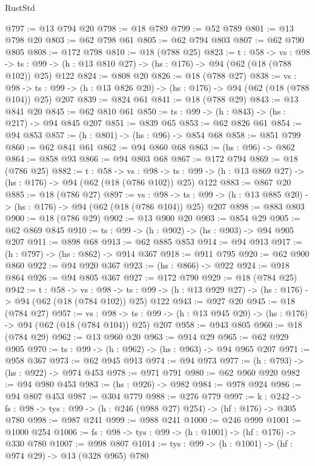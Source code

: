 \begin{lexlean}{RustStd}
\begin{coremodule}
{\begin{coremodule}
{{{{{{{{{{{@797 := @13 @794 @20
@798 := @18 @789
@799 := @52 @789
@801 := @13 @798 @20
@803 := @62 @798 @61
@805 := @62 @794 @803
@807 := @62 @790 @805
@808 := @172 @798
@810 := @18 (@788 @25)
@823 := {t : @58} ->
  {vs : @98} ->
  {ts : @99} -> (h : @13 @810 @27) -> (hs : @176) -> @94 (@62 (@18 (@788 @102)) @25) @122
@824 := @808 @20
@826 := @18 (@788 @27)
@838 := {vs : @98} ->
  {ts : @99} -> (h : @13 @826 @20) -> (hs : @176) -> @94 (@62 (@18 (@788 @104)) @25) @207
@839 := @824 @61
@841 := @18 (@788 @29)
@843 := @13 @841 @20
@845 := @62 @810 @61
@850 := {ts : @99} -> (h : @843) -> (hs : @217) -> @94 @845 @207
@851 := @839 @65
@853 := @62 @826 @61
@854 := @94 @853
@857 := (h : @801) -> (hs : @96) -> @854 @68
@858 := @851 @799
@860 := @62 @841 @61
@862 := @94 @860 @68
@863 := (hs : @96) -> @862
@864 := @858 @93
@866 := @94 @803 @68
@867 := @172 @794
@869 := @18 (@786 @25)
@882 := {t : @58} ->
  {vs : @98} ->
  {ts : @99} -> (h : @13 @869 @27) -> (hs : @176) -> @94 (@62 (@18 (@786 @102)) @25) @122
@883 := @867 @20
@885 := @18 (@786 @27)
@897 := {vs : @98} ->
  {ts : @99} -> (h : @13 @885 @20) -> (hs : @176) -> @94 (@62 (@18 (@786 @104)) @25) @207
@898 := @883 @803
@900 := @18 (@786 @29)
@902 := @13 @900 @20
@903 := @854 @29
@905 := @62 @869 @845
@910 := {ts : @99} -> (h : @902) -> (hs : @903) -> @94 @905 @207
@911 := @898 @68
@913 := @62 @885 @853
@914 := @94 @913
@917 := (h : @797) -> (hs : @862) -> @914 @367
@918 := @911 @795
@920 := @62 @900 @860
@922 := @94 @920 @367
@923 := (hs : @866) -> @922
@924 := @918 @864
@926 := @94 @805 @367
@927 := @172 @790
@929 := @18 (@784 @25)
@942 := {t : @58} ->
  {vs : @98} ->
  {ts : @99} -> (h : @13 @929 @27) -> (hs : @176) -> @94 (@62 (@18 (@784 @102)) @25) @122
@943 := @927 @20
@945 := @18 (@784 @27)
@957 := {vs : @98} ->
  {ts : @99} -> (h : @13 @945 @20) -> (hs : @176) -> @94 (@62 (@18 (@784 @104)) @25) @207
@958 := @943 @805
@960 := @18 (@784 @29)
@962 := @13 @960 @20
@963 := @914 @29
@965 := @62 @929 @905
@970 := {ts : @99} -> (h : @962) -> (hs : @963) -> @94 @965 @207
@971 := @958 @367
@973 := @62 @945 @913
@974 := @94 @973
@977 := (h : @793) -> (hs : @922) -> @974 @453
@978 := @971 @791
@980 := @62 @960 @920
@982 := @94 @980 @453
@983 := (hs : @926) -> @982
@984 := @978 @924
@986 := @94 @807 @453
@987 := @304 @779
@988 := @276 @779
@997 := {k : @242} ->
  {fs : @98} -> {tys : @99} -> (h : @246 (@988 @27) @254) -> (hf : @176) -> @305 @780
@998 := @987 @241
@999 := @988 @241
@1000 := @246 @999
@1001 := @1000 @254
@1006 := {fs : @98} -> {tys : @99} -> (h : @1001) -> (hf : @176) -> @330 @780
@1007 := @998 @807
@1014 := {tys : @99} -> (h : @1001) -> (hf : @974 @29) -> @13 (@328 @965) @780
}}}}}}}}}}}
\end{coremodule}}
\end{coremodule}
\end{lexlean}
